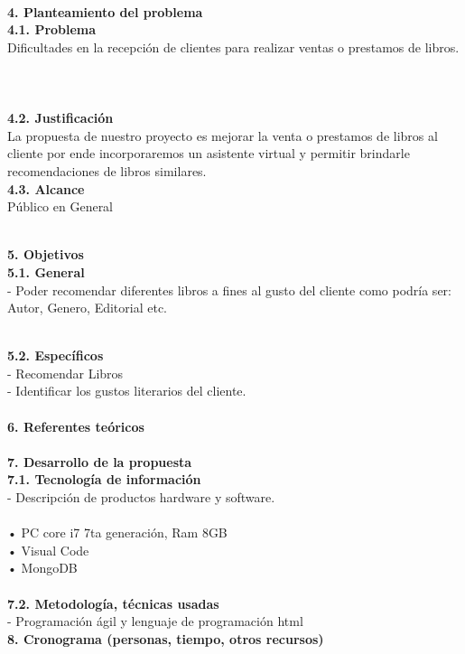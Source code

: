 \begin{flushleft}
\begin{itemize}
\textbf{ }\\

\textbf{4.	Planteamiento del problema}\\
\textbf{4.1. 	Problema}\\

Dificultades en la recepción de clientes para realizar ventas o prestamos de libros.\textbf{ }\\
\textbf{ }\\
\textbf{ }\\
\textbf{ }\\
\textbf{4.2.	Justificación }\\

La propuesta de nuestro proyecto es mejorar la venta o prestamos de libros al cliente por ende incorporaremos un asistente virtual y permitir brindarle recomendaciones de libros similares. 
\textbf{ }\\
\textbf{4.3.	Alcance }\\
Público en General


\textbf{ }\\
\textbf{5.      Objetivos}\\
\textbf{5.1.   General}\\
-	Poder recomendar diferentes libros a fines al gusto del cliente como podría ser: Autor, Genero, Editorial etc. 

\textbf{ }\\

\textbf{5.2.   Específicos}\\

-	Recomendar Libros\\
-	Identificar los gustos literarios del cliente.\\

\textbf{ }\\

\textbf{6.      Referentes teóricos}\\
\textbf{ }\\
\textbf{7.      Desarrollo de la propuesta}\\
\textbf{7.1.   Tecnología de información}\\
-	Descripción de productos hardware y software.\\ 
\textbf{ }\\

•	PC core i7 7ta generación, Ram 8GB \\
•	Visual Code\\
•	MongoDB\\
\textbf{ }\\
\textbf{7.2.   Metodología, técnicas usadas }\\
-	Programación ágil y lenguaje de programación html
\textbf{ }\\
\textbf{8.      Cronograma (personas, tiempo, otros recursos) }\\
\textbf{ }\\


\end{itemize}
\end{flushleft}
